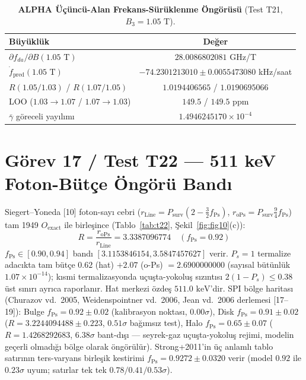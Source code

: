 \documentclass[12pt,a4paper]{article}
\begin{document}
\begin{table}[!htbp]
\centering
\footnotesize
\setlength{\tabcolsep}{3pt}
\caption{\textbf{ALPHA Üçüncü-Alan Frekans-Sürüklenme Öngörüsü} (Test T21, $B_3=1.05\text{ T}$).}
\label{tab:t21}
\vspace{0.1cm}
\begin{tabular}{@{}l|c@{}}
\hline
Büyüklük & Değer \\
\hline
$\partial f_{da}/\partial B(1.05\text{ T})$ & $28.0086802081$ GHz/T \\
$\dot{f}_{\mathrm{pred}}(1.05\text{ T})$ & $-74.2301213010 \pm 0.0055473080$ kHz/saat \\
$R(1.05/1.03)$ / $R(1.07/1.05)$ & $1.0194406565$ / $1.0190695066$ \\
LOO ($1.03\to1.07$ / $1.07\to1.03$) & $149.5$ / $149.5\text{ ppm}$ \\
$\bar{\gamma}$ göreceli yayılımı & $1.4946245170\times 10^{-4}$ \\
\hline
\end{tabular}
\end{table}

\section{Görev 17 / Test T22 --- 511 keV Foton-Bütçe Öngörü Bandı}

Siegert--Yoneda [10] foton-sayı cebri ($r_{\mathrm{Line}}=P_{\mathrm{surv}}(2-\frac32f_{\mathrm{Ps}})$, $r_{\mathrm{oPs}}=P_{\mathrm{surv}}\frac94f_{\mathrm{Ps}}$) tam 1949 $O_{\mathrm{exact}}$ ile birleşince (Tablo~\ref{tab:t22}, Şekil~\ref{fig:fig10}(c)):
\begin{equation}
\boxed{R = \frac{r_{\mathrm{oPs}}}{r_{\mathrm{Line}}} = 3.3387096774 \quad (f_{\mathrm{Ps}} = 0.92)}
\label{eq:t22R}
\end{equation}
$f_{\mathrm{Ps}}\in[0.90,0.94]$ bandı $[3.1153846154, 3.5847457627]$ verir. $P_s=1$ termalize adacıkta tam bütçe $0.62$ (hat) $+2.07$ (o-Ps) $=2.6900000000$ (sayısal bütünlük $1.07\times 10^{-14}$); kısmi termalizasyonda uçuşta-yokoluş sızıntısı $2(1-P_s)\le 0.38$ üst sınırı ayrıca raporlanır. Hat merkezi özdeş $511.0\text{ keV}$'dir. SPI bölge haritası (Churazov vd.\ 2005, Weidenspointner vd.\ 2006, Jean vd.\ 2006 derlemesi [17--19]): Bulge $f_{\mathrm{Ps}}=0.92\pm0.02$ (kalibrasyon noktası, $0.00\sigma$), Disk $f_{\mathrm{Ps}}=0.91\pm0.02$ ($R=3.2244094488\pm0.223$, $0.51\sigma$ bağımsız test), Halo $f_{\mathrm{Ps}}=0.65\pm0.07$ ($R=1.4268292683$, $6.38\sigma$ bant-dışı --- seyrek-gaz uçuşta-yokoluş rejimi, modelin geçerli olmadığı bölge olarak öngörülür). Strong+2011'in üç anlamlı tablo satırının ters-varyans birleşik kestirimi $f_{\mathrm{Ps}}=0.9272\pm0.0320$ verir (model $0.92$ ile $0.23\sigma$ uyum; satırlar tek tek $0.78/0.41/0.53\sigma$).
\end{document}

